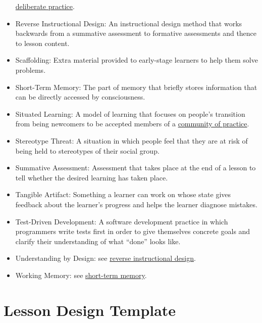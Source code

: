 \documentclass[10pt,statementpaper]{memoir}
\begin{document}
\begin{itemize}
  \href{gloss.html\#deliberate-practice}{deliberate practice}.
\item
  \protect\hypertarget{reverse-instructional-design}{}{Reverse
  Instructional Design}: An instructional design method that works
  backwards from a summative assessment to formative assessments and
  thence to lesson content.
\item
  \protect\hypertarget{scaffolding}{}{Scaffolding}: Extra material
  provided to early-stage learners to help them solve problems.
\item
  \protect\hypertarget{short-term-memory}{}{Short-Term Memory}: The part
  of memory that briefly stores information that can be directly
  accessed by consciousness.
\item
  \protect\hypertarget{situated-learning}{}{Situated Learning}: A model
  of learning that focuses on people's transition from being newcomers
  to be accepted members of a
  \href{gloss.html\#community-of-practice}{community of practice}.
\item
  \protect\hypertarget{stereotype-threat}{}{Stereotype Threat}: A
  situation in which people feel that they are at risk of being held to
  stereotypes of their social group.
\item
  \protect\hypertarget{summative-assessment}{}{Summative Assessment}:
  Assessment that takes place at the end of a lesson to tell whether the
  desired learning has taken place.
\item
  \protect\hypertarget{tangible-artifact}{}{Tangible Artifact}:
  Something a learner can work on whose state gives feedback about the
  learner's progress and helps the learner diagnose mistakes.
\item
  \protect\hypertarget{test-driven-development}{}{Test-Driven
  Development}: A software development practice in which programmers
  write tests first in order to give themselves concrete goals and
  clarify their understanding of what ``done'' looks like.
\item
  \protect\hypertarget{understanding-by-design}{}{Understanding by
  Design}: see \href{gloss.html\#reverse-instructional-design}{reverse
  instructional design}.
\item
  \protect\hypertarget{working-memory}{}{Working Memory}: see
  \href{gloss.html\#short-term-memory}{short-term memory}.
\end{itemize}

\chapter{Lesson Design Template}\label{lesson-design-template}
\end{document}
